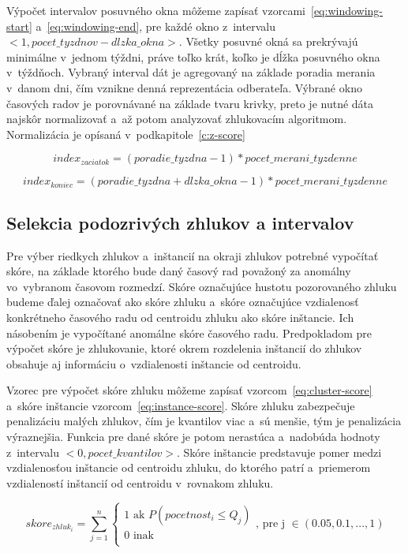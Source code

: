 \documentclass[a4paper,twoside,slovak,12pt,appendix]{article}
\begin{document}
Výpočet intervalov posuvného okna môžeme zapísať
vzorcami~\ref{eq:windowing-start} a~\ref{eq:windowing-end}, pre každé okno
z~intervalu $<1, pocet\_tyzdnov - dlzka\_okna>$. Všetky posuvné okná sa
prekrývajú minimálne v~jednom týždni, práve toľko krát, koľko je dĺžka posuvného
okna v~týždňoch. Vybraný interval dát je agregovaný na základe poradia merania
v~danom dni, čím vznikne denná reprezentácia odberateľa. Výbrané okno časových
radov je porovnávané na základe tvaru krivky, preto je nutné dáta najskôr
normalizovať a~až potom analyzovať zhlukovacím algoritmom. Normalizácia je
opísaná v~podkapitole~\ref{c:z-score}

\begin{equation}
  index_{zaciatok} = (poradie\_tyzdna - 1) * pocet\_merani\_tyzdenne
  \label{eq:windowing-start}
\end{equation}

\begin{equation}
  index_{koniec} = (poradie\_tyzdna + dlzka\_okna - 1) * pocet\_merani\_tyzdenne
  \label{eq:windowing-end}
\end{equation}

\subsection{Selekcia podozrivých zhlukov a intervalov}
Pre výber riedkych zhlukov a~inštancií na okraji zhlukov potrebné vypočítať
skóre, na základe ktorého bude daný časový rad považoný za anomálny vo~vybranom
časovom rozmedzí. Skóre označujúce hustotu pozorovaného zhluku budeme ďalej
označovať ako skóre zhluku a~skóre označujúce vzdialenosť konkrétneho časového
radu od centroidu zhluku ako skóre inštancie. Ich násobením je vypočítané
anomálne skóre časového radu. Predpokladom pre výpočet skóre je zhlukovanie,
ktoré okrem rozdelenia inštancií do zhlukov obsahuje aj informáciu
o~vzdialenosti inštancie od centroidu.

Vzorec pre výpočet skóre zhluku môžeme zapísať vzorcom~\ref{eq:cluster-score}
a~skóre inštancie vzorcom~\ref{eq:instance-score}. Skóre zhluku zabezpečuje
penalizáciu malých zhlukov, čím je kvantilov viac a~sú menšie, tým je
penalizácia výraznejšia. Funkcia pre dané skóre je potom nerastúca
a~nadobúda hodnoty z~intervalu $<0, pocet\_kvantilov>$. Skóre inštancie
predstavuje pomer medzi vzdialenosťou inštancie od centroidu zhluku, do ktorého
patrí a~priemerom vzdialeností inštancií od centroidu v~rovnakom zhluku.

\begin{equation}
  skore_{zhluk_i} = \sum_{j=1}^{n}
  \begin{cases}
    1 \text{ ak } P(pocetnost_i \leq Q_j) \\
    0 \text{ inak } \\
  \end{cases}
  \text{, pre j } \in (0.05, 0.1, ..., 1)
  \label{eq:cluster-score}
\end{equation}
\end{document}
